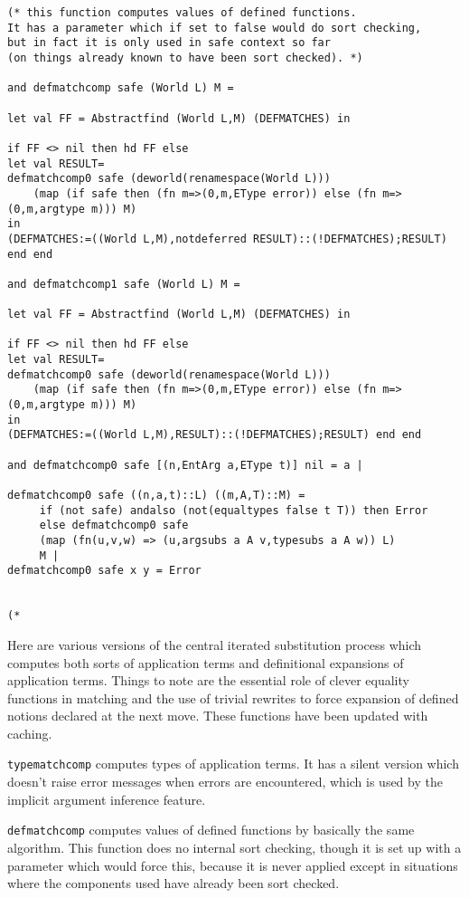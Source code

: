 \documentclass{article}
\begin{document}
\begin{verbatim}
(* this function computes values of defined functions.
It has a parameter which if set to false would do sort checking,
but in fact it is only used in safe context so far 
(on things already known to have been sort checked). *)

and defmatchcomp safe (World L) M = 

let val FF = Abstractfind (World L,M) (DEFMATCHES) in

if FF <> nil then hd FF else
let val RESULT=
defmatchcomp0 safe (deworld(renamespace(World L))) 
    (map (if safe then (fn m=>(0,m,EType error)) else (fn m=>(0,m,argtype m))) M)
in
(DEFMATCHES:=((World L,M),notdeferred RESULT)::(!DEFMATCHES);RESULT) end end

and defmatchcomp1 safe (World L) M = 

let val FF = Abstractfind (World L,M) (DEFMATCHES) in

if FF <> nil then hd FF else
let val RESULT=
defmatchcomp0 safe (deworld(renamespace(World L))) 
    (map (if safe then (fn m=>(0,m,EType error)) else (fn m=>(0,m,argtype m))) M)
in
(DEFMATCHES:=((World L,M),RESULT)::(!DEFMATCHES);RESULT) end end

and defmatchcomp0 safe [(n,EntArg a,EType t)] nil = a |

defmatchcomp0 safe ((n,a,t)::L) ((m,A,T)::M) =
     if (not safe) andalso (not(equaltypes false t T)) then Error
     else defmatchcomp0 safe
     (map (fn(u,v,w) => (u,argsubs a A v,typesubs a A w)) L)
     M |
defmatchcomp0 safe x y = Error


(*

\end{verbatim}

Here are various versions of the central iterated substitution process which computes both sorts of application terms
and definitional expansions of application terms.  Things to note are the essential role of clever equality functions in
matching and the use of trivial rewrites to force expansion of defined notions declared at the next move.  These functions have been updated with caching.

{\tt typematchcomp} computes types of application terms.  It has a silent version which doesn't raise error messages when errors are encountered,
which is used by the implicit argument inference feature.

{\tt defmatchcomp} computes values of defined functions by basically the same algorithm.  This function does no internal sort checking, though it is set up with a parameter which would force this, because it is never applied except in situations where the components used have already been sort checked.
\end{document}
